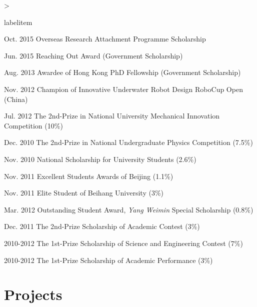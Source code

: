 \documentclass[10pt,letterpaper]{article}
\makeatletter
\newenvironment{dateitemize}{%
  \ifnum \@itemdepth >\thr@@\@toodeep\else
    \advance\@itemdepth\@ne
    \edef\@itemitem{labelitem\romannumeral\the\@itemdepth}%
    \expandafter
    \list
      \csname\@itemitem\endcsname
      {%
      \advance\rightmargin3cm
      \def\makelabel##1{\hss\llap{\textbullet}\rlap{\hbox to \dimexpr\linewidth+\rightmargin+\itemsep\relax{\hss##1}}}}%
  \fi}
\makeatother
\begin{document}
\begin{dateitemize}
  \item[Oct. 2015] Overseas Research Attachment Programme Scholarship
  \item[Jun. 2015] Reaching Out Award (Government Scholarship)
  \item[Aug. 2013] Awardee of Hong Kong PhD Fellowship (Government Scholarship)
  \item[Nov. 2012] Champion of Innovative Underwater Robot Design RoboCup Open (China)
  \item[Jul. 2012] The 2nd-Prize in National University Mechanical Innovation Competition (10\%)
  \item[Dec. 2010] The 2nd-Prize in National Undergraduate Physics Competition (7.5\%)
  \item[Nov. 2010] National Scholarship for University Students (2.6\%)
  \item[Nov. 2011] Excellent Students Awards of Beijing (1.1\%)
  \item[Nov. 2011] Elite Student of Beihang University (3\%)
  \item[Mar. 2012] Outstanding Student Award, \textit{Yang Weimin} Special Scholarship (0.8\%)
  \item[Dec. 2011] The 2nd-Prize Scholarship of Academic Contest (3\%)
  \item[2010-2012] The 1st-Prize Scholarship of Science and Engineering Contest (7\%)
  \item[2010-2012] The 1st-Prize Scholarship of Academic Performance (3\%)
\end{dateitemize}

\newpage
\section*{Projects}
\end{document}
